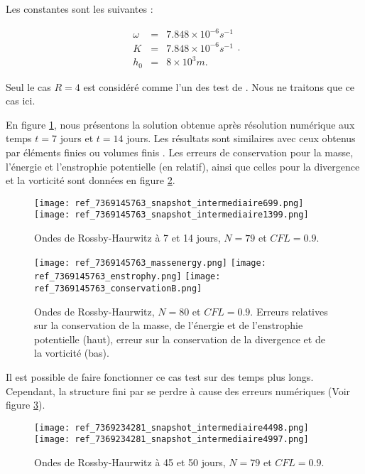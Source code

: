 Les constantes sont les suivantes :

\begin{equation}
\begin{array}{rcl}
\omega & = & 7.848 \times 10^{-6} \si{s^{-1}}\\
K & = & 7.848 \times 10^{-6} \si{s^{-1}}\\
h_0 & = & 8 \times 10^3 \si{m}.
\end{array}.
\end{equation} 

Seul le cas $R=4$ est considéré comme l'un des test de \cite{Williamson1992}. Nous ne traitons que ce cas ici.

En figure \ref{fig: rossby 714}, nous présentons la solution obtenue après résolution numérique aux temps $t=7$ jours et $t=14$ jours. Les résultats sont similaires avec ceux obtenus par éléments finies ou volumes finis \cite{Galewsky2004, Chen2008}. Les erreurs de conservation pour la masse, l'énergie et l'enstrophie potentielle (en relatif), ainsi que celles pour la divergence et la vorticité sont données en figure \ref{fig: rossby conservation}.

\begin{figure}[htbp]
\begin{center}
\texttt{[image: ref\_7369145763\_snapshot\_intermediaire699.png]}
\texttt{[image: ref\_7369145763\_snapshot\_intermediaire1399.png]}
\end{center}
\caption{Ondes de Rossby-Haurwitz à 7 et 14 jours, $N=79$ et $CFL=0.9$.}
\label{fig: rossby 714}
\end{figure}

\begin{figure}[htbp]
\begin{center}
\texttt{[image: ref\_7369145763\_massenergy.png]}
\texttt{[image: ref\_7369145763\_enstrophy.png]}
\texttt{[image: ref\_7369145763\_conservationB.png]}
\end{center}
\caption{Ondes de Rossby-Haurwitz, $N=80$ et $CFL=0.9$. Erreurs relatives sur la conservation de la masse, de l'énergie et de l'enstrophie potentielle (haut), erreur sur la conservation de la divergence et de la vorticité (bas).}
\label{fig: rossby conservation}
\end{figure}

Il est possible de faire fonctionner ce cas test sur des temps plus longs. Cependant, la structure fini par se perdre à cause des erreurs numériques (Voir figure \ref{fig: rossby 4550}).

\begin{figure}[htbp]
\begin{center}
\texttt{[image: ref\_7369234281\_snapshot\_intermediaire4498.png]}
\texttt{[image: ref\_7369234281\_snapshot\_intermediaire4997.png]}
\end{center}
\caption{Ondes de Rossby-Haurwitz à 45 et 50 jours, $N=79$ et $CFL=0.9$.}
\label{fig: rossby 4550}
\end{figure}
